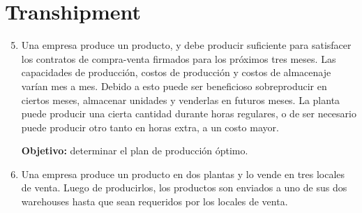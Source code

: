 \documentclass{article}
\begin{document}
\section*{Transhipment}

\begin{enumerate}
    \setcounter{enumi}{4} %
    \item Una empresa produce un producto, y debe producir suficiente para satisfacer los contratos de compra-venta firmados para los próximos tres meses.  
    Las capacidades de producción, costos de producción y costos de almacenaje varían mes a mes.  
    Debido a esto puede ser beneficioso sobreproducir en ciertos meses, almacenar unidades y venderlas en futuros meses.  
    La planta puede producir una cierta cantidad durante horas regulares, o de ser necesario puede producir otro tanto en horas extra, a un costo mayor.  

    \textbf{Objetivo:} determinar el plan de producción óptimo.

    \begin{table}[h]
        \centering
    \end{table}

    \item Una empresa produce un producto en dos plantas y lo vende en tres locales de venta. Luego de producirlos, los productos son enviados a uno de sus dos warehouses hasta que sean requeridos por los locales de venta.  


\end{enumerate}
\end{document}
